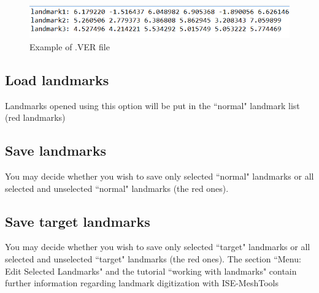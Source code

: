 \begin{figure}
  \centering
  \includegraphics[scale=0.7]{images/Landmarks/VER_file.png}
 \caption{Example of .VER file}
\label{VER_file}
\end{figure}


\subsection{Load landmarks}
Landmarks opened using this option will be put in the ``normal" landmark list (red landmarks)
\subsection{Save landmarks}
You may decide whether you wish to save only selected ``normal" landmarks or all selected and
unselected ``normal" landmarks (the red ones).
\subsection{Save target landmarks}

You may decide whether you wish to save only selected ``target" landmarks or all selected and
unselected ``target" landmarks (the red ones).
The section ``Menu: Edit Selected Landmarks" and the tutorial ``working with landmarks" contain
further information regarding landmark digitization with ISE-MeshTools


